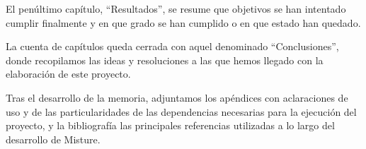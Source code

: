 El penúltimo capítulo, ``Resultados'', se resume que objetivos se han intentado cumplir finalmente y en que grado se han cumplido o en que estado han quedado.


La cuenta de capítulos queda cerrada con aquel denominado ``Conclusiones'', donde recopilamos las ideas y resoluciones a las que hemos llegado con la elaboración de este proyecto.


Tras el desarrollo de la memoria, adjuntamos los apéndices con aclaraciones de uso y de las particularidades de las dependencias necesarias para la ejecución del proyecto, y la bibliografía las principales referencias utilizadas a lo largo del desarrollo de Misture.


